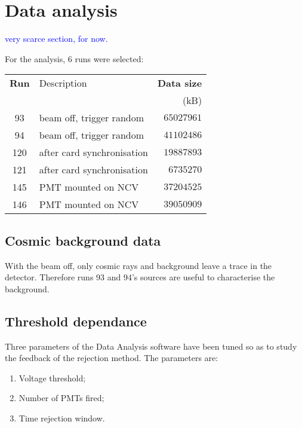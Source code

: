 
\chapter[Measurement]{Data analysis}
\label{cha:5}
\textcolor{blue}{very scarce section, for now.}


For the analysis, 6 runs were selected:

\begin{center}
  \small
  \begin{tabular}{clr}
    \toprule
    \textbf{Run}	& Description	& \textbf{Data size}		\\
    			&		&	(kB)			\\
    \midrule
    93		& beam off, trigger random	& $ 65027961	$	\\
    94		& beam off, trigger random	& $ 41102486	$	\\
    120		& after card synchronisation	& $ 19887893	$	\\
    121		& after card synchronisation	& $ 6735270	$	\\
    145		& PMT mounted on NCV		& $ 37204525	$	\\
    146		& PMT mounted on NCV		& $ 39050909	$	\\
    \bottomrule
  \end{tabular}
\end{center}


\section{Cosmic background data}
With the beam off, only cosmic rays and background leave a trace in the detector.
Therefore runs 93 and 94's sources are useful to characterise the background.

\section{Threshold dependance}

Three parameters of the Data Analysis software have been tuned so as to study the feedback %
of the rejection method.
The parameters are:
\begin{enumerate}
  \item Voltage threshold;
  \item Number of PMTs fired;
  \item Time rejection window.
\end{enumerate}

